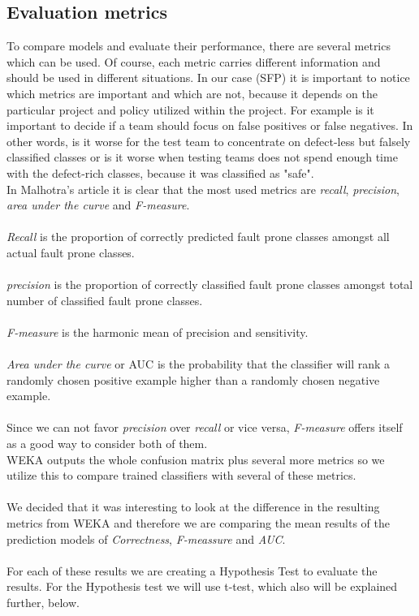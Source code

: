 \subsection{Evaluation metrics}
To compare models and evaluate their performance, there are several metrics which can be used. Of course, each metric carries different information and should be used in different situations. In our case (SFP) it is important to notice which metrics are important and which are not, because it depends on the particular project and policy utilized within the project.
For example is it important to decide if a team should focus on false positives or false negatives. In other words, is it worse for the test team to concentrate on defect-less but falsely classified classes or is it worse when testing teams does not spend enough time with the defect-rich classes, because it was classified as "safe". \\
In Malhotra's article\cite{malhotra2015systematic} it is clear that the most used metrics are \textit{recall}, \textit{precision}, \textit{area under the curve} and \textit{F-measure}. \\\\
\textit{Recall} is the proportion of correctly predicted fault prone classes amongst all actual fault prone classes.\cite{malhotra2015systematic}\\\\
\textit{precision} is the proportion of correctly classified fault prone classes amongst total number of classified fault prone classes.\cite{malhotra2015systematic}\\\\
\textit{F-measure} is the harmonic mean of precision and sensitivity.\cite{malhotra2015systematic}\\\\
\textit{Area under the curve} or AUC is the probability that the classifier will rank a randomly chosen positive example higher than a randomly chosen negative example.\cite{japkowicz2011evaluating}\\\\
Since we can not favor \textit{precision} over \textit{recall} or vice versa, \textit{F-measure} offers itself as a good way to consider both of them.\\
WEKA outputs the whole confusion matrix plus several more metrics so we utilize this to compare trained classifiers with several of these metrics. \\\\
We decided that it was interesting to look at the difference in the resulting metrics from WEKA and therefore we are comparing the mean results of the prediction models of \textit{Correctness}, \textit{F-meassure} and \textit{AUC}.\\\\
For each of these results we are creating a Hypothesis Test to evaluate the results. For the Hypothesis test we will use t-test, which also will be explained further, below. 